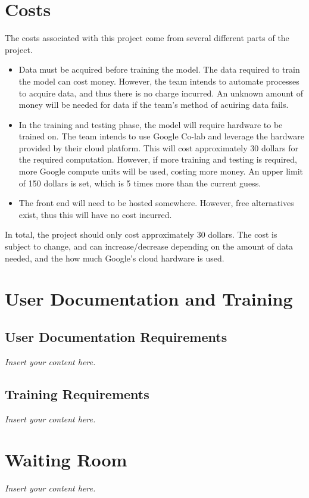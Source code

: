 \documentclass[12pt]{article}
\newcommand{\lips}{\textit{Insert your content here.}}
\begin{document}
\section{Costs}
The costs associated with this project come from several different parts of the project.
\begin{itemize}
    \item Data must be acquired before training the model. The data required to
    train the model can cost money. However, the team intends to automate
    processes to acquire data, and thus there is no charge incurred. An unknown
    amount of money will be needed for data if the team's method of acuiring
    data fails.
    \item In the training and testing phase, the model will require hardware to
    be trained on. The team intends to use Google Co-lab and leverage the
    hardware provided by their cloud platform. This will cost approximately 30
    dollars for the required computation. However, if more training and testing
    is required, more Google compute units will be used, costing more money. An
    upper limit of 150 dollars is set, which is 5 times more than the current
    guess. 
    \item The front end will need to be hosted somewhere. However, free
    alternatives exist, thus this will have no cost incurred.

\end{itemize}
In total, the project should only cost approximately 30 dollars. The cost is
subject to change, and can increase/decrease depending on the amount of data
needed, and the how much Google's cloud hardware is used.

\section{User Documentation and Training}
\subsection{User Documentation Requirements}
\lips
\subsection{Training Requirements}
\lips

\section{Waiting Room}
\lips
\end{document}
